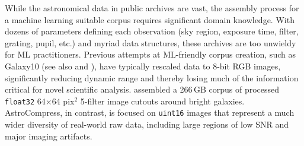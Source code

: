While the astronomical data in public archives \citep{mast2024} are vast, the assembly process for a machine learning suitable corpus requires significant domain knowledge. With dozens of parameters defining each observation (sky region, exposure time, filter, grating, pupil, etc.) and myriad data structures, these archives are too unwieldy for ML practitioners. %
Previous attempts at ML-friendly corpus creation, such as Galaxy10 \citep{2019MNRAS.483.3255L} (see also \citealt{2023arXiv230711122X} and  \citealt{yolo}), have typically rescaled data to 8-bit RGB images, significantly reducing dynamic range and thereby losing much of the information critical for novel scientific analysis. \citet{2021ApJ...911L..33H} assembled a 266\,GB corpus of processed \texttt{float32} 64$\times$64 pix$^2$ 5-filter image cutouts around bright galaxies. AstroCompress, in contrast, is focused on  \texttt{uint16} images that represent a much wider diversity of real-world raw data, including large regions of low SNR and major imaging artifacts. 


